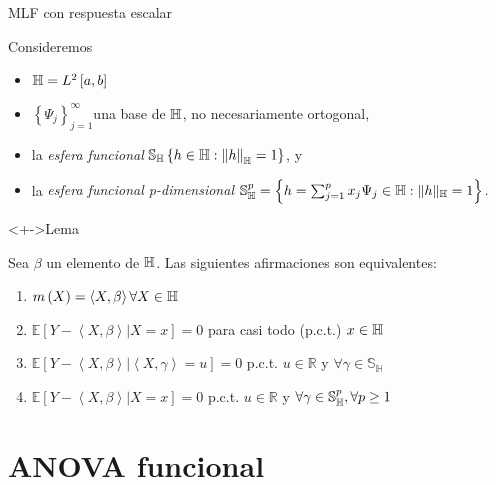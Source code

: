 \documentclass[10pt,spanish]{beamer}\usepackage[]{graphicx}\usepackage[]{color}
\begin{document}
\begin{frame}{MLF con respuesta escalar}

Consideremos
\begin{itemize}[<+->]
\item $\mathbb{H}=L^{2}\left[a,b\right]$
\item $\left\{ \Psi_{j}\right\} _{j=1}^{\infty}$una base de $\mathbb{H}$, no necesariamente
ortogonal,
\item la \emph{esfera funcional} $\mathbb{S_{H}}\left\{ h\in\mathbb{H}:\left\Vert h\right\Vert _{\mathbb{H}}=1\right\} $,
y
\item la \emph{esfera funcional p-dimensional $\mathbb{S}_{\mathbb{H}}^{p}=\left\{ h=\sum_{j=1}^{p}x_{j}\Psi_{j}\in\mathbb{H}:\|h\|_{\mathbb{H}}=1\right\} $. }
\end{itemize}
\begin{exampleblock}<+->{Lema \cite{Patilea 2012}}

Sea $\beta$ un elemento de $\mathbb{H}$. Las siguientes afirmaciones son
equivalentes:
\begin{enumerate}[<+->]
\item $m\left(X\right)=\left\langle X,\beta\right\rangle \forall X\in\mathbb{H}$
\item $\mathbb{E}\left[Y-\left\langle X,\beta\right\rangle |X=x\right]=0$
para casi todo (p.c.t.) $x\in\mathbb{H}$
\item $\mathbb{E}\left[Y-\left\langle X,\beta\right\rangle |\left\langle X,\gamma\right\rangle =u\right]=0$
p.c.t. $u\in\mathbb{R}$ y $\forall\gamma\in\mathbb{S_{H}}$
\item $\mathbb{E}\left[Y-\left\langle X,\beta\right\rangle |X=x\right]=0$
p.c.t. $u\in\mathbb{R}$ y $\forall\gamma\in\mathbb{S}_{\mathbb{H}}^{p},\forall p\geq1$
\end{enumerate}
\end{exampleblock}
\end{frame}

\section[ANOVA funcional]{ANOVA funcional }
\end{document}
